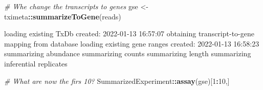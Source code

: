 \documentclass[
]{article}
\newenvironment{Shaded}{\begin{snugshade}}{\end{snugshade}}
\newcommand{\CommentTok}[1]{\textcolor[rgb]{0.56,0.35,0.01}{\textit{#1}}}
\newcommand{\DecValTok}[1]{\textcolor[rgb]{0.00,0.00,0.81}{#1}}
\newcommand{\FunctionTok}[1]{\textcolor[rgb]{0.13,0.29,0.53}{\textbf{#1}}}
\newcommand{\NormalTok}[1]{#1}
\newcommand{\OtherTok}[1]{\textcolor[rgb]{0.56,0.35,0.01}{#1}}
\newcommand{\SpecialCharTok}[1]{\textcolor[rgb]{0.81,0.36,0.00}{\textbf{#1}}}
\begin{document}
\begin{Shaded}
\begin{Highlighting}[]
\CommentTok{\# Whe change the transcripts to genes}
\NormalTok{gse }\OtherTok{\textless{}{-}}\NormalTok{ tximeta}\SpecialCharTok{::}\FunctionTok{summarizeToGene}\NormalTok{(reads)}
\end{Highlighting}
\end{Shaded}

\begin{Shaded}
\begin{Highlighting}[]
\NormalTok{loading existing TxDb created: 2022{-}01{-}13 16:57:07}
\NormalTok{obtaining transcript{-}to{-}gene mapping from database}
\NormalTok{loading existing gene ranges created: 2022{-}01{-}13 16:58:23}
\NormalTok{summarizing abundance}
\NormalTok{summarizing counts}
\NormalTok{summarizing length}
\NormalTok{summarizing inferential replicates}
\end{Highlighting}
\end{Shaded}

\begin{Shaded}
\begin{Highlighting}[]
\CommentTok{\# What are now the firs 10?}
\NormalTok{SummarizedExperiment}\SpecialCharTok{::}\FunctionTok{assay}\NormalTok{(gse)[}\DecValTok{1}\SpecialCharTok{:}\DecValTok{10}\NormalTok{,]}
\end{Highlighting}
\end{Shaded}
\end{document}
